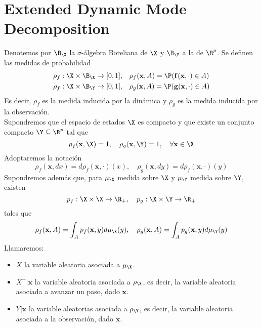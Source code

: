 
\section{Extended Dynamic Mode Decomposition}

Denotemos por $\B_\X$ la $\sigma$-álgebra Boreliana de $\X$ y $\B_\Y$ a la de $\R^p$.
Se definen las medidas de probabilidad
\begin{equation*}
	\begin{aligned}
		\rho_f: \X \times \B_\X \to [0, 1], & \quad \rho_f (\mathbf{x}, A) = \P (\mathbf{f}(\mathbf{x}, \cdot ) \in A ) \\
		\rho_f: \X \times \B_\Y \to [0, 1], & \quad \rho_g(\mathbf{x}, A) = \P (\mathbf{g}(\mathbf{x}, \cdot ) \in A)
	\end{aligned}
\end{equation*}
Es decir, $\rho_f$ es la medida inducida por la dinámica y $\rho_g$ es la medida inducida por la observación.
\\
Supondremos que el espacio de estados $\X$ es compacto y que existe un conjunto compacto $\Y \subseteq \R^p$ tal que
\begin{equation*}
	\rho_f (\mathbf{x}, \X) = 1, \quad \rho_g (\mathbf{x}, \Y) = 1, \quad \forall \mathbf{x} \in \X
\end{equation*}
Adoptaremos la notación
\begin{equation*}
	\rho_f (\mathbf{x}, dx) = d \rho_f (\mathbf{x}, \cdot)(x), \quad \rho_g (\mathbf{x}, dy) = d \rho_f (\mathbf{x}, \cdot)(y)
\end{equation*}
Supondremos además que, para $\mu_\X$ medida sobre $\X$ y $\mu_\Y$ medida sobre $\Y$, existen \begin{equation*}
	p_f : \X \times \X \to \R_+, \quad p_g : \X \times \Y \to \R_+
\end{equation*}
tales que
\begin{equation*}
	\rho_f (\mathbf{x}, A) = \int_A p_f (\mathbf{x}, y) d \mu_\X (y), \quad \rho_g (\mathbf{x}, A) = \int_A p_g (\mathbf{x}, y) d \mu_\Y (y)
\end{equation*}
Llamaremos:
\begin{itemize}
	\item $X$ la variable aleatoria asociada a $\mu_\X$.
	\item $X^+ | \textbf{x}$ la variable aleatoria asociada a $\rho_\X$, es decir, la variable aleatoria asociada a avanzar un paso, dado $\textbf{x}$.
	\item $Y  | \textbf{x}$ la variable aleatorias asociada a $\rho_\Y$, es decir, la variable aleatoria asociada a la observación, dado $\textbf{x}$.
\end{itemize}
